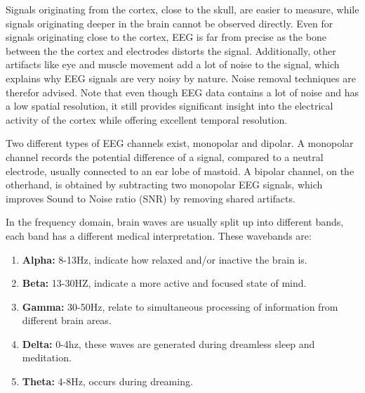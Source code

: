 
Signals originating from the cortex, close to the skull, are easier to measure, while signals originating deeper in the brain cannot be observed directly. Even for signals originating close to the cortex, EEG is far from precise as the bone between the the cortex and electrodes distorts the signal. Additionally, other artifacts like eye and muscle movement add a lot of noise to the signal, which explains why EEG signals are very noisy by nature. Noise removal techniques are therefor advised\citep{noiseRem}. Note that even though EEG data contains a lot of noise and has a low spatial resolution, it still provides significant insight into the electrical activity of the cortex while offering excellent temporal resolution\cite{GivenPaper}.

\npar

Two different types of EEG channels exist, monopolar and dipolar. A monopolar channel records the potential difference of a signal, compared to a neutral electrode, usually connected to an ear lobe of mastoid. A bipolar channel, on the otherhand, is obtained by subtracting two monopolar EEG signals, which improves Sound to Noise ratio (SNR)  by removing shared artifacts\cite{MonoBiPolar}. 

\npar 

In the frequency domain, brain waves are usually split up into different bands\cite{EmotionRelativePower,WavesSite}, each band has a different medical interpretation. These wavebands \label{wavebands} are:
\begin{enumerate}
\item \textbf{Alpha:} 8-13Hz, indicate how relaxed and/or inactive the brain is.
\item \textbf{Beta:} 13-30HZ, indicate a more active and focused state of mind.
\item \textbf{Gamma:} 30-50Hz, relate to simultaneous processing of information from different brain areas.
\item \textbf{Delta:} 0-4hz, these waves are generated during dreamless sleep and meditation.
\item \textbf{Theta:} 4-8Hz, occurs during dreaming.
\end{enumerate}

\npar

